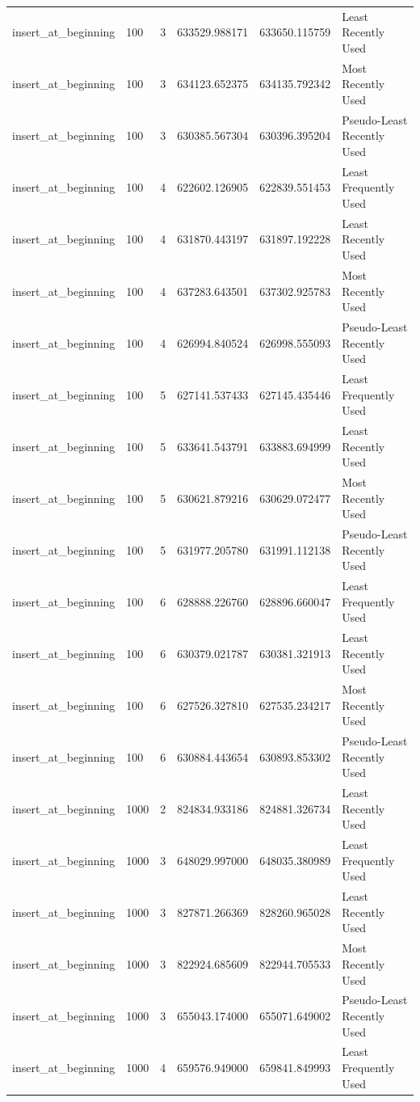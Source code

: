 \begin{tabular}{llrrrl}
insert_at_beginning & 100 & 3 & 633529.988171 & 633650.115759 & Least Recently Used \\
insert_at_beginning & 100 & 3 & 634123.652375 & 634135.792342 & Most Recently Used \\
insert_at_beginning & 100 & 3 & 630385.567304 & 630396.395204 & Pseudo-Least Recently Used \\
insert_at_beginning & 100 & 4 & 622602.126905 & 622839.551453 & Least Frequently Used \\
insert_at_beginning & 100 & 4 & 631870.443197 & 631897.192228 & Least Recently Used \\
insert_at_beginning & 100 & 4 & 637283.643501 & 637302.925783 & Most Recently Used \\
insert_at_beginning & 100 & 4 & 626994.840524 & 626998.555093 & Pseudo-Least Recently Used \\
insert_at_beginning & 100 & 5 & 627141.537433 & 627145.435446 & Least Frequently Used \\
insert_at_beginning & 100 & 5 & 633641.543791 & 633883.694999 & Least Recently Used \\
insert_at_beginning & 100 & 5 & 630621.879216 & 630629.072477 & Most Recently Used \\
insert_at_beginning & 100 & 5 & 631977.205780 & 631991.112138 & Pseudo-Least Recently Used \\
insert_at_beginning & 100 & 6 & 628888.226760 & 628896.660047 & Least Frequently Used \\
insert_at_beginning & 100 & 6 & 630379.021787 & 630381.321913 & Least Recently Used \\
insert_at_beginning & 100 & 6 & 627526.327810 & 627535.234217 & Most Recently Used \\
insert_at_beginning & 100 & 6 & 630884.443654 & 630893.853302 & Pseudo-Least Recently Used \\
insert_at_beginning & 1000 & 2 & 824834.933186 & 824881.326734 & Least Recently Used \\
insert_at_beginning & 1000 & 3 & 648029.997000 & 648035.380989 & Least Frequently Used \\
insert_at_beginning & 1000 & 3 & 827871.266369 & 828260.965028 & Least Recently Used \\
insert_at_beginning & 1000 & 3 & 822924.685609 & 822944.705533 & Most Recently Used \\
insert_at_beginning & 1000 & 3 & 655043.174000 & 655071.649002 & Pseudo-Least Recently Used \\
insert_at_beginning & 1000 & 4 & 659576.949000 & 659841.849993 & Least Frequently Used \\

\end{tabular}

